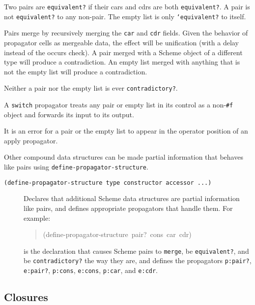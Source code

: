 \documentclass[12pt,letterpaper,english]{article}
\begin{document}
Two pairs are \texttt{equivalent?} if their cars and cdrs are both
\texttt{equivalent?}.  A pair is not \texttt{equivalent?} to any non-pair.  The
empty list is only \texttt{`equivalent?} to itself.

Pairs merge by recursively merging the \texttt{car} and \texttt{cdr} fields.
Given the behavior of propagator cells as mergeable data, the effect
will be unification (with a delay instead of the occurs check).  A
pair merged with a Scheme object of a different type will produce a
contradiction.  An empty list merged with anything that is not the
empty list will produce a contradiction.

Neither a pair nor the empty list is ever \texttt{contradictory?}.

A \texttt{switch} propagator treats any pair or empty list in its control
as a non-\texttt{{\#}f} object and forwards its input to its output.

It is an error for a pair or the empty list to appear in the operator
position of an apply propagator.

Other compound data structures can be made partial information that
behaves like pairs using \texttt{define-propagator-structure}.
\begin{description}
\item[{\texttt{(define-propagator-structure type constructor accessor ...)}}] \leavevmode 
Declares that additional Scheme data structures are partial
information like pairs, and defines appropriate propagators
that handle them.  For example:
\begin{quote}{\ttfamily \raggedright \noindent
(define-propagator-structure~pair?~cons~car~cdr)
}\end{quote}
is the declaration that causes Scheme pairs to \texttt{merge}, be
\texttt{equivalent?}, and be \texttt{contradictory?} the way they are, and
defines the propagators \texttt{p:pair?}, \texttt{e:pair?}, \texttt{p:cons},
\texttt{e:cons}, \texttt{p:car}, and \texttt{e:cdr}.

\end{description}



\hypertarget{closures}{}
\subsection{Closures}
\label{closures}
\end{document}
